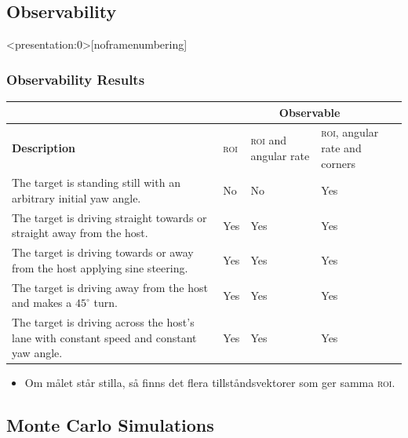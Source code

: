 \documentclass{beamer}
\newcommand{\roi}{\textsc{roi}\xspace}
\renewcommand{\a}{\r{a}\xspace}
\begin{document}
\subsection<presentation:0>
{Observability}

\begin{frame}<presentation:0>[noframenumbering]
	\frametitle{Observability Results}
	\begin{table}
		\centering
		\scriptsize
		\renewcommand{\arraystretch}{1.25}
		\setlength{\arrayrulewidth}{0.5pt}
		\begin{tabular}{|p{5cm}|p{1cm}|p{2.1cm}|p{2.1cm}|}
			\cline{2-4}
			\multicolumn{1}{c|}{} & \multicolumn{3}{c|}{\textbf{Observable}} \\
			\hline
			\textbf{Description} & \roi & \roi and angular rate & \roi, angular rate and corners \\
			\hline
			\hline
			The target is standing still with an arbitrary initial yaw angle. & No & No & Yes \\
			\hline
			The target is driving straight towards or straight away from the host. & Yes & Yes & Yes \\
			\hline
			The target is driving towards or away from the host applying sine steering. & Yes & Yes & Yes \\
			\hline
			The target is driving away from the host and makes a $45^\circ$ turn. & Yes & Yes & Yes \\
			\hline
			The target is driving across the host's lane with constant speed and constant yaw angle. & Yes & Yes & Yes \\
			\hline
		\end{tabular}
	\end{table}

	\note
	{
		\begin{itemize}
			\item Om m\a{}let st\a{}r stilla, s\a{} finns det flera tillst\a{}ndsvektorer som ger samma \roi.
		\end{itemize}
	}
\end{frame}

\subsection{Monte Carlo Simulations}
\end{document}
